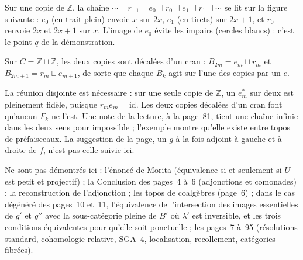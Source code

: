 Sur une copie de $\mathbb Z$, la chaîne $\cdots \dashv r_{-1} \dashv e_0 \dashv r_0 \dashv e_1 \dashv r_1 \dashv \cdots$ se lit sur la figure suivante : $e_0$ (en trait plein) envoie $x$ sur $2x$, $e_1$ (en tirets) sur $2x + 1$, et $r_0$ renvoie $2x$ et $2x + 1$ sur $x$. L'image de $e_0$ évite les impairs (cercles blancs) : c'est le point $q$ de la démonstration.
\begin{center}
\end{center}
Sur $C = \mathbb Z \sqcup \mathbb Z$, les deux copies sont décalées d'un cran : $B_{2m} = e_m \sqcup r_m$ et $B_{2m+1} = r_m \sqcup e_{m+1}$, de sorte que chaque $B_k$ agit sur l'une des copies par un $e$.

\begin{remarque}
La réunion disjointe est nécessaire : sur une seule copie de $\mathbb Z$, un $e_m^*$ sur deux est pleinement fidèle, puisque $r_m e_m = \mathrm{id}$. Les deux copies décalées d'un cran font qu'aucun $F_k$ ne l'est. Une note de la lecture, à la page~81, tient une chaîne infinie dans les deux sens pour impossible  ; l'exemple montre qu'elle existe entre topos de préfaisceaux. La suggestion de la page, un $g$ à la fois adjoint à gauche et à droite de $f$, n'est pas celle suivie ici.
\end{remarque}

Ne sont pas démontrés ici : l'énoncé de Morita (équivalence si et seulement si $U$ est petit et projectif) ; la Conclusion des pages~4 à~6 (adjonctions et comonades) ; la reconstruction de l'adjonction ; les topos de coalgèbres (page~6) ; dans le cas dégénéré des pages~10 et~11, l'équivalence de l'intersection des images essentielles de $g'$ et $g''$ avec la sous-catégorie pleine de $B'$ où $\lambda'$ est inversible, et les trois conditions équivalentes pour qu'elle soit ponctuelle ; les pages~7 à~95 (résolutions standard, cohomologie relative, SGA~4, localisation, recollement, catégories fibrées).

